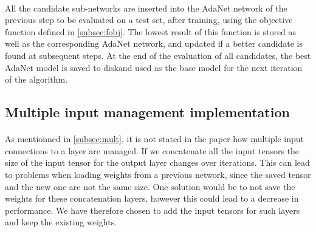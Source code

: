 \documentclass[11 pt]{article}
\begin{document}
\paragraph{}All the candidate sub-networks are inserted into the AdaNet network of the previous step to be evaluated on a test set, after training, using the objective function defined in \ref{subsec:fobj}. The lowest result of this function is stored as well as the corresponding AdaNet network, and updated if a better candidate is found at subsequent steps. At the end of the evaluation of all candidates, the best AdaNet model is saved to diskand used as the base model for the next iteration of the algorithm.

\subsection{Multiple input management implementation}
\paragraph{}As mentionned in \ref{subsec:mult}, it is not stated in the paper how multiple input connections to a layer are managed. If we concatenate all the input tensors the size of the input tensor for the output layer changes over iterations. This can lead to problems when loading weights from a previous network, since the saved tensor and the new one are not the same size. One solution would be to not save the weights for these concatenation layers, however this could lead to a decrease in performance. We have therefore chosen to add the input tensors for such layers and keep the existing weights.
\end{document}
